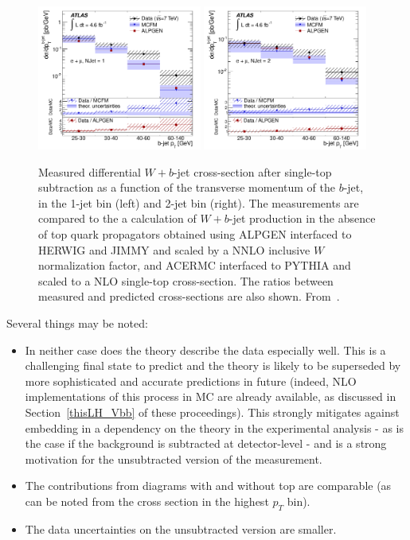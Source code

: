 \documentclass[11pt]{cernrep}
\begin{document}
\begin{figure}
\centering
	\includegraphics[width=0.48\textwidth]{fig_08a.pdf}
	\includegraphics[width=0.48\textwidth]{fig_08b.pdf}
\caption{\label{fig:notop}
Measured differential $W+b$-jet cross-section after single-top subtraction as a function of the transverse momentum of the $b$-jet, in the 
1-jet bin (left) and 2-jet bin (right). 
The measurements are compared to the a calculation of $W+b$-jet production in the absence of top quark propagators obtained using ALPGEN interfaced to HERWIG and JIMMY and scaled by a NNLO inclusive $W$ normalization factor, and ACERMC interfaced to PYTHIA and scaled to a NLO single-top cross-section. 
The ratios between measured and predicted cross-sections are also shown. From~\protect\cite{Aad:2013vka}.}
\end{figure}

Several things may be noted:
\begin{itemize}
\item In neither case does the theory describe the data especially well. This is a challenging
final state to predict and the theory is likely to be superseded by more sophisticated and 
accurate predictions in future (indeed, NLO implementations of this
process in MC are already available, as discussed in
Section~\ref{thisLH_Vbb} of these proceedings). This strongly mitigates against embedding in a dependency 
on the theory in the experimental analysis - as is the case if the background is subtracted at detector-level - 
and is a strong motivation for the unsubtracted version of the
measurement. 
\item The contributions from diagrams 
with and without top are comparable (as can be noted from the cross section in the highest $p_T$ bin).
\item The data uncertainties on the unsubtracted version are smaller.
\end{itemize}
\end{document}
